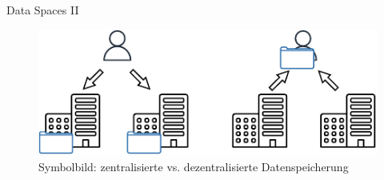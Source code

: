\begin{frame}[c]{Data Spaces II \footnotesize\cite{mollerIndustrialDataEcosystems2024}}
    \vspace{1.5em}
    \begin{figure}
        \includegraphics[height=0.6\textheight]{./assets/central_vs_decentral.drawio.pdf}
        \caption{Symbolbild: zentralisierte vs. dezentralisierte Datenspeicherung}
    \end{figure}
\end{frame}


